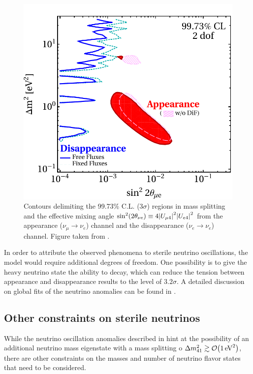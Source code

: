 \begin{figure}
    \centering
    \includegraphics[width=0.7\linewidth]{figures/theory/app-disapp.pdf}
    \caption{Contours delimiting the 99.73\% C.L. ($3\sigma$) regions in mass splitting and the effective mixing angle $\sin^2(2\theta_{\nu e})\equiv 4\abs{U_{\mu 4}}^2\abs{U_{e4}}^2$ from the appearance ($\nu_\mu \rightarrow \nu_e$) channel and the disappearance ($\nu_e \rightarrow \nu_e$) channel. Figure taken from \cite{Dentler_2018}.\label{fig:app-disapp-tension}}
\end{figure}
In order to attribute the observed phenomena to sterile neutrino oscillations, the model would require additional degrees of freedom.
One possibility is to give the heavy neutrino state the ability to decay, which can reduce the tension between appearance and disappearance results to the level of $3.2\sigma$\cite{Diaz_2020}.
A detailed discussion on global fits of the neutrino anomalies can be found in .

\subsection{Other constraints on sterile neutrinos}
While the neutrino oscillation anomalies described in  hint at the possibility of an additional neutrino mass eigenstate with a mass splitting o $\Delta m^2_{41} \gtrsim \order{\SI{1}{eV^2}}$, there are other constraints on the masses and number of neutrino flavor states that need to be considered.

